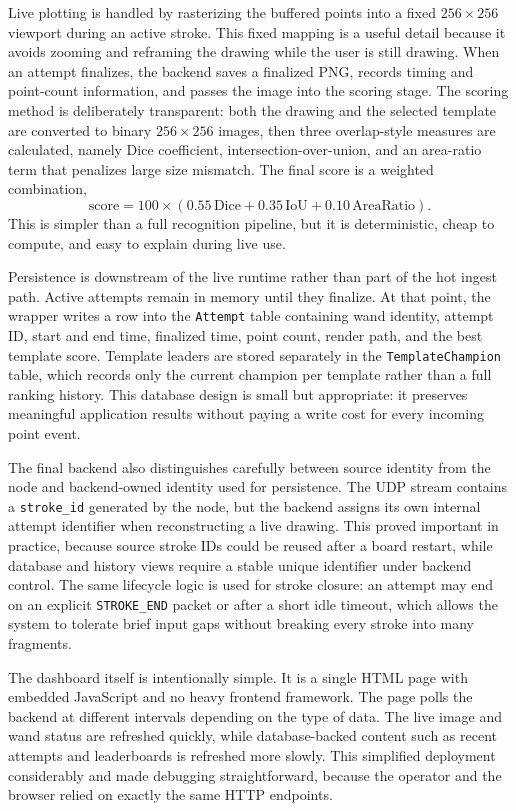 \documentclass[10pt,a4paper]{article}
\begin{document}
Live plotting is handled by rasterizing the buffered points into a fixed
$256\times256$ viewport during an active stroke. This fixed mapping is a useful
detail because it avoids zooming and reframing the drawing while the user is
still drawing. When an attempt finalizes, the backend saves a finalized PNG,
records timing and point-count information, and passes the image into the
scoring stage. The scoring method is deliberately transparent: both the drawing
and the selected template are converted to binary $256\times256$ images, then
three overlap-style measures are calculated, namely Dice coefficient,
intersection-over-union, and an area-ratio term that penalizes large size
mismatch. The final score is a weighted combination,
\[
\mathrm{score} = 100 \times (0.55\,\mathrm{Dice} + 0.35\,\mathrm{IoU} + 0.10\,\mathrm{AreaRatio}).
\]
This is simpler than a full recognition pipeline, but it is deterministic,
cheap to compute, and easy to explain during live use.

Persistence is downstream of the live runtime rather than part of the hot ingest
path. Active attempts remain in memory until they finalize. At that point, the
wrapper writes a row into the \texttt{Attempt} table containing wand identity,
attempt ID, start and end time, finalized time, point count, render path, and
the best template score. Template leaders are stored separately in the
\texttt{TemplateChampion} table, which records only the current champion per
template rather than a full ranking history. This database design is small but
appropriate: it preserves meaningful application results without paying a write
cost for every incoming point event.

The final backend also distinguishes carefully between source identity from the
node and backend-owned identity used for persistence. The UDP stream contains a
\texttt{stroke\_id} generated by the node, but the backend assigns its own
internal attempt identifier when reconstructing a live drawing. This proved
important in practice, because source stroke IDs could be reused after a board
restart, while database and history views require a stable unique identifier
under backend control. The same lifecycle logic is used for stroke closure: an
attempt may end on an explicit \texttt{STROKE\_END} packet or after a short idle
timeout, which allows the system to tolerate brief input gaps without breaking
every stroke into many fragments.

The dashboard itself is intentionally simple. It is a single HTML page with
embedded JavaScript and no heavy frontend framework. The page polls the backend
at different intervals depending on the type of data. The live image and wand
status are refreshed quickly, while database-backed content such as recent
attempts and leaderboards is refreshed more slowly. This simplified deployment
considerably and made debugging straightforward, because the operator and the
browser relied on exactly the same HTTP endpoints.
\end{document}

